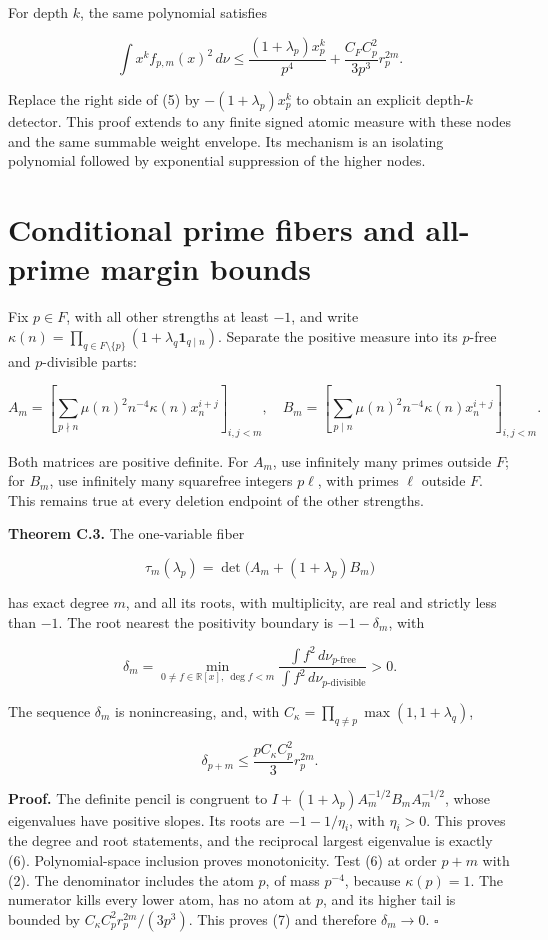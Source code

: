 For depth \(k\), the same polynomial satisfies

\[
\int x^k f_{p,m}(x)^2\,d\nu
\le\frac{(1+\lambda_p)x_p^k}{p^4}
+\frac{C_F C_p^2}{3p^3}r_p^{2m}.
\]

Replace the right side of (5) by \(-(1+\lambda_p)x_p^k\) to obtain an
explicit depth-\(k\) detector. This proof extends to any finite signed
atomic measure with these nodes and the same summable weight envelope.
Its mechanism is an isolating polynomial followed by exponential
suppression of the higher nodes.

\hypertarget{conditional-prime-fibers-and-all-prime-margin-bounds}{%
\section{Conditional prime fibers and all-prime margin
bounds}\label{conditional-prime-fibers-and-all-prime-margin-bounds}}

Fix \(p\in F\), with all other strengths at least \(-1\), and write
\(\kappa(n)=\prod_{q\in F\setminus\{p\}}(1+\lambda_q\mathbf1_{q\mid n})\).
Separate the positive measure into its \(p\)-free and \(p\)-divisible
parts:

\[
A_m=[\sum_{p\nmid n}\mu(n)^2n^{-4}\kappa(n)x_n^{i+j}]_{i,j<m},
\quad
B_m=[\sum_{p\mid n}\mu(n)^2n^{-4}\kappa(n)x_n^{i+j}]_{i,j<m}.
\]

Both matrices are positive definite. For \(A_m\), use infinitely many
primes outside \(F\); for \(B_m\), use infinitely many squarefree
integers \(p\ell\), with primes \(\ell\) outside \(F\). This remains
true at every deletion endpoint of the other strengths.

\textbf{Theorem C.3.} The one-variable fiber

\[
\tau_m(\lambda_p)=\det\bigl(A_m+(1+\lambda_p)B_m\bigr)
\]

has exact degree \(m\), and all its roots, with multiplicity, are real
and strictly less than \(-1\). The root nearest the positivity boundary
is \(-1-\delta_m\), with

\[
\delta_m=\min_{0\ne f\in\mathbb R[x],\ \deg f<m}
\frac{\int f^2\,d\nu_{p\text{-free}}}{\int f^2\,d\nu_{p\text{-divisible}}}>0.
\tag{6}
\]

The sequence \(\delta_m\) is nonincreasing, and, with
\(C_\kappa=\prod_{q\ne p}\max(1,1+\lambda_q)\),

\[
\boxed{\delta_{p+m}\le\frac{p C_\kappa C_p^2}{3}r_p^{2m}.}
\tag{7}
\]

\textbf{Proof.} The definite pencil is congruent to
\(I+(1+\lambda_p)A_m^{-1/2}B_mA_m^{-1/2}\), whose eigenvalues have
positive slopes. Its roots are \(-1-1/\eta_i\), with \(\eta_i>0\). This
proves the degree and root statements, and the reciprocal largest
eigenvalue is exactly (6). Polynomial-space inclusion proves
monotonicity. Test (6) at order \(p+m\) with (2). The denominator
includes the atom \(p\), of mass \(p^{-4}\), because \(\kappa(p)=1\).
The numerator kills every lower atom, has no atom at \(p\), and its
higher tail is bounded by \(C_\kappa C_p^2r_p^{2m}/(3p^3)\). This proves
(7) and therefore \(\delta_m\to0\). \(\square\)

